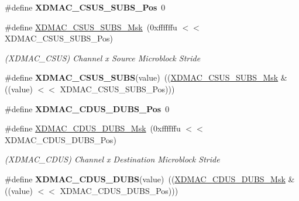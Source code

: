\begin{DoxyCompactItemize}
\item 
\mbox{\label{group__SAMV71__XDMAC_gabe71a37896283684f0eb00b83369ff5c}} 
\#define {\bfseries X\+D\+M\+A\+C\+\_\+\+C\+S\+U\+S\+\_\+\+S\+U\+B\+S\+\_\+\+Pos}~0
\item 
\mbox{\label{group__SAMV71__XDMAC_gad45ae394b8779c0dadfc72dc107bdf43}} 
\#define \mbox{\hyperlink{group__SAMV71__XDMAC_gad45ae394b8779c0dadfc72dc107bdf43}{X\+D\+M\+A\+C\+\_\+\+C\+S\+U\+S\+\_\+\+S\+U\+B\+S\+\_\+\+Msk}}~(0xffffffu $<$$<$ X\+D\+M\+A\+C\+\_\+\+C\+S\+U\+S\+\_\+\+S\+U\+B\+S\+\_\+\+Pos)
\begin{DoxyCompactList}\small\item\em (X\+D\+M\+A\+C\+\_\+\+C\+S\+US) Channel x Source Microblock Stride \end{DoxyCompactList}\item 
\mbox{\label{group__SAMV71__XDMAC_ga49299293673411271ca686591bd59e14}} 
\#define {\bfseries X\+D\+M\+A\+C\+\_\+\+C\+S\+U\+S\+\_\+\+S\+U\+BS}(value)~((\mbox{\hyperlink{group__SAMV71__XDMAC_gad45ae394b8779c0dadfc72dc107bdf43}{X\+D\+M\+A\+C\+\_\+\+C\+S\+U\+S\+\_\+\+S\+U\+B\+S\+\_\+\+Msk}} \& ((value) $<$$<$ X\+D\+M\+A\+C\+\_\+\+C\+S\+U\+S\+\_\+\+S\+U\+B\+S\+\_\+\+Pos)))
\item 
\mbox{\label{group__SAMV71__XDMAC_ga6273e9fa1812798d1fb408bc771f132e}} 
\#define {\bfseries X\+D\+M\+A\+C\+\_\+\+C\+D\+U\+S\+\_\+\+D\+U\+B\+S\+\_\+\+Pos}~0
\item 
\mbox{\label{group__SAMV71__XDMAC_gaca37f4c47181b3ab679d04c10bf1acb4}} 
\#define \mbox{\hyperlink{group__SAMV71__XDMAC_gaca37f4c47181b3ab679d04c10bf1acb4}{X\+D\+M\+A\+C\+\_\+\+C\+D\+U\+S\+\_\+\+D\+U\+B\+S\+\_\+\+Msk}}~(0xffffffu $<$$<$ X\+D\+M\+A\+C\+\_\+\+C\+D\+U\+S\+\_\+\+D\+U\+B\+S\+\_\+\+Pos)
\begin{DoxyCompactList}\small\item\em (X\+D\+M\+A\+C\+\_\+\+C\+D\+US) Channel x Destination Microblock Stride \end{DoxyCompactList}\item 
\mbox{\label{group__SAMV71__XDMAC_ga7645600da33407dcf7645fefa9959938}} 
\#define {\bfseries X\+D\+M\+A\+C\+\_\+\+C\+D\+U\+S\+\_\+\+D\+U\+BS}(value)~((\mbox{\hyperlink{group__SAMV71__XDMAC_gaca37f4c47181b3ab679d04c10bf1acb4}{X\+D\+M\+A\+C\+\_\+\+C\+D\+U\+S\+\_\+\+D\+U\+B\+S\+\_\+\+Msk}} \& ((value) $<$$<$ X\+D\+M\+A\+C\+\_\+\+C\+D\+U\+S\+\_\+\+D\+U\+B\+S\+\_\+\+Pos)))

\end{DoxyCompactItemize}
